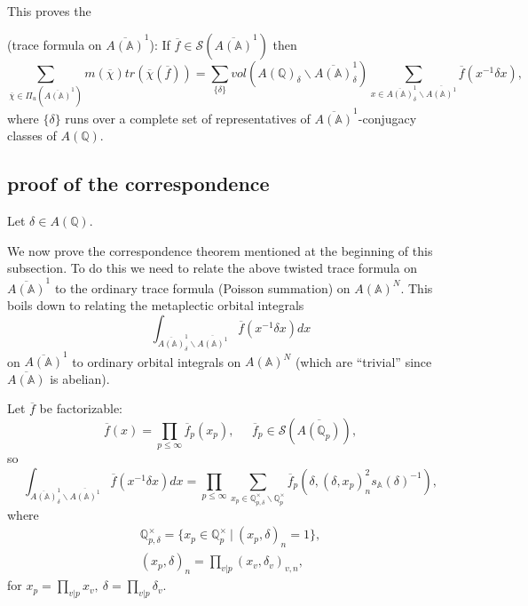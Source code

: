 This proves the

\begin{theorem}\label{thm:3.9}
(trace formula on $\overline{A({\mathbb{A}})}^1$):
If $\overline{f}\in {\mathcal{S}}(\overline{A({\mathbb{A}})}^1)$ then 
\[
\sum_{\overline{\chi }\in \Pi_u (\overline{A({\mathbb{A}})}^1)}
m(\overline{\chi })
tr(\overline{\chi }(\overline{f}))
=\sum_{\{\delta \}}
vol(A({\mathbb{Q}})_\delta \backslash \overline{A({\mathbb{A}})}_\delta ^1)
\sum_{x\in \overline{A({\mathbb{A}})}_\delta ^1
\backslash \overline{A({\mathbb{A}})^1}}
\overline{f}(x^{-1}\delta x),
\]
where $\{\delta \}$ runs over a complete set of representatives of
$\overline{A({\mathbb{A}})}^1$-conjugacy classes of
$A({\mathbb{Q}})$.
\end{theorem}

\subsection{proof of the correspondence}\label{ssec:rank0corr}

Let $\delta\in A({\mathbb{Q}})$.

We now prove the correspondence theorem mentioned at the beginning of this
subsection. To do this we need to relate the above twisted trace
formula on $\overline{A({\mathbb{A}})}^1$ to the ordinary trace
formula (Poisson summation) on $A({\mathbb{A}})^N$. This boils down to
relating the metaplectic orbital integrals 
\[
\int_{\overline{A({\mathbb{A}})}_\delta ^1
\backslash \overline{A({\mathbb{A}})^1}}
\overline{f}(x^{-1}\delta x)dx
\]
on $\overline{A({\mathbb{A}})}^1$ to ordinary orbital integrals
on $A({\mathbb{A}})^N$ (which are ``trivial'' since
$\overline{A({\mathbb{A}})}$ is abelian).

Let $\overline{f}$ be factorizable: 
\[
\overline{f}(x)=\prod_{p\leq \infty}\overline{f}_p(x_p),
\;\;\;\;\;\overline{f}_p\in {\mathcal{S}}(\overline{A({\mathbb{Q}}_p)}),
\]
so 
\begin{equation}\label{eq:3.15}
\int_{\overline{A({\mathbb{A}})}_\delta ^1
\backslash \overline{A({\mathbb{A}})^1}}
\overline{f}(x^{-1}\delta x)dx
=\prod_{p\leq \infty}
\sum_{x_p\in {\mathbb{Q}}_{p,\delta}^\times
\backslash {\mathbb{Q}}_p^\times}
\overline{f}_p(\delta ,(\delta,x_p)_n^2s_{\mathbb{A}}(\delta)^{-1} ),
\end{equation}
where
\[
\begin{array}{c}
{\mathbb{Q}}_{p,\delta}^\times
=\{x_p\in {\mathbb{Q}}_p^\times
\ |\ (x_p,\delta )_n=1\},\\
(x_p,\delta)_n=\prod_{v|p}(x_v,\delta_v)_{v,n},
\end{array}
\]
for $x_p=\prod_{v|p}x_v,\ \delta=\prod_{v|p}\delta_v$.
 
